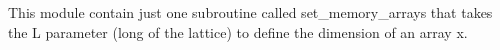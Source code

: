 This module contain just one subroutine called set_memory_arrays that takes the L parameter (long of the lattice) to define the dimension of an array x.